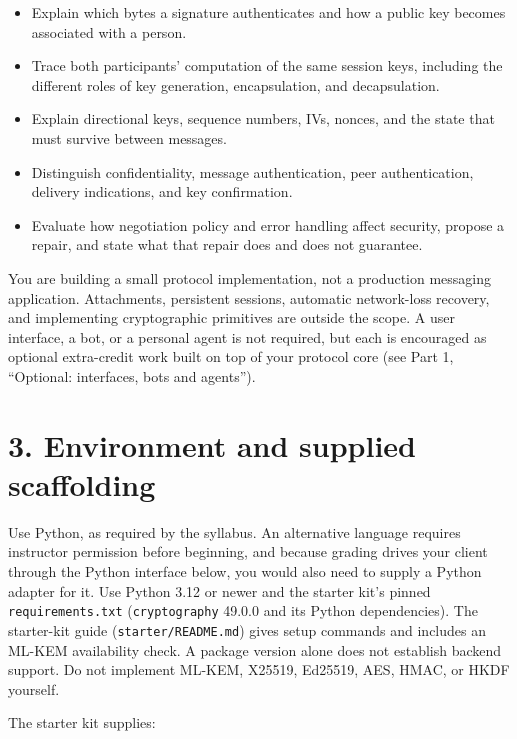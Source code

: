 \documentclass[11pt]{article}
\newcommand{\file}[1]{\texttt{#1}}
\begin{document}
\begin{itemize}
\item Explain which bytes a signature authenticates and how a public key becomes associated with a person.
\item Trace both participants' computation of the same session keys, including the different roles of key generation, encapsulation, and decapsulation.
\item Explain directional keys, sequence numbers, IVs, nonces, and the state that must survive between messages.
\item Distinguish confidentiality, message authentication, peer authentication, delivery indications, and key confirmation.
\item Evaluate how negotiation policy and error handling affect security, propose a repair, and state what that repair does and does not guarantee.
\end{itemize}
You are building a small protocol implementation, not a production messaging application. Attachments, persistent sessions, automatic network-loss recovery, and implementing cryptographic primitives are outside the scope. A user interface, a bot, or a personal agent is not required, but each is encouraged as optional extra-credit work built on top of your protocol core (see Part 1, ``Optional: interfaces, bots and agents'').

\section*{3. Environment and supplied scaffolding}

Use Python, as required by the syllabus. An alternative language requires instructor permission before beginning, and because grading drives your client through the Python interface below, you would also need to supply a Python adapter for it. Use Python 3.12 or newer and the starter kit's pinned \texttt{requirements.txt} (\texttt{cryptography} 49.0.0 and its Python dependencies). The starter-kit guide (\file{starter/README.md}) gives setup commands and includes an ML-KEM availability check. A package version alone does not establish backend support. Do not implement ML-KEM, X25519, Ed25519, AES, HMAC, or HKDF yourself.

The starter kit supplies:
\end{document}
